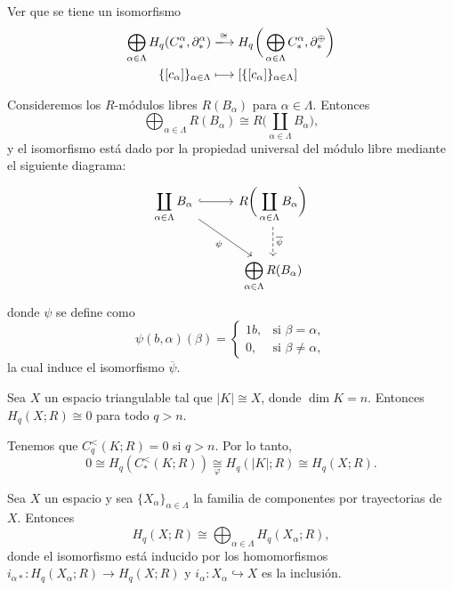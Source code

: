 \begin{ejercicio}
Ver que se tiene un isomorfismo
\begin{align*}
    \bigoplus_{\alpha \in \Lambda} H_q(C_*^\alpha, \partial_*^\alpha)&\xlongrightarrow[]{\cong} H_q\hspace{0.2mm}\bigg(\displaystyle\bigoplus_{\alpha \in \Lambda} C_*^\alpha, \partial_*^\oplus\bigg)\\
    \{[c_\alpha]\}_{\alpha \in \Lambda}&\longmapsto [\{[c_\alpha]\}_{\alpha \in \Lambda}]
\end{align*}
\end{ejercicio}

\begin{nota}
Consideremos los $R$-módulos libres $R(B_\alpha)$ para $\alpha \in \Lambda$. Entonces
\[
\bigoplus_{\alpha \in \Lambda} R(B_\alpha) \cong R\bigg(\coprod_{\alpha \in \Lambda} B_\alpha\bigg),
\]
y el isomorfismo está dado por la propiedad universal del módulo libre mediante el siguiente diagrama:
\[
\begin{tikzcd}[column sep=2.8em, row sep=2.4em]
\displaystyle\coprod_{\alpha \in \Lambda} B_\alpha \arrow[r, hook] \arrow[dr, "\psi"'] & R\bigg(\displaystyle\coprod_{\alpha \in \Lambda} B_\alpha\bigg) \arrow[d, dashed, "\overline{\psi}"] \\
& \displaystyle\bigoplus_{\alpha \in \Lambda} R(B_\alpha)
\end{tikzcd}
\]
donde $\psi$ se define como
\[
\psi(b, \alpha)(\beta) =
\begin{cases}
    1b, & \text{si } \beta = \alpha, \\
    0, & \text{si } \beta \neq \alpha,
\end{cases}
\]
la cual induce el isomorfismo $\overline{\psi}$.
\end{nota}

\begin{corolario}
Sea $X$ un espacio triangulable tal que $|K| \cong X$, donde $\dim K = n$. Entonces $H_q(X; R) \cong 0$ para todo $q > n$.
\end{corolario}

\begin{dem}
Tenemos que $C_q^<(K; R) = 0$ si $q > n$. Por lo tanto,
\[
0 \cong H_q(C_*^<(K; R)) \underset{\varphi}{\cong} H_q(|K|; R) \cong H_q(X; R).
\]
\end{dem}
\begin{prop}
Sea $X$ un espacio y sea $\{X_\alpha\}_{\alpha \in \Lambda}$ la familia de componentes por trayectorias de $X$. Entonces
\[
H_q(X; R) \cong \bigoplus_{\alpha \in \Lambda} H_q(X_\alpha; R),
\]
donde el isomorfismo está inducido por los homomorfismos $i_{\alpha*} \colon H_q(X_\alpha; R) \to H_q(X; R)$ y $i_\alpha \colon X_\alpha \hookrightarrow X$ es la inclusión.
\end{prop}

